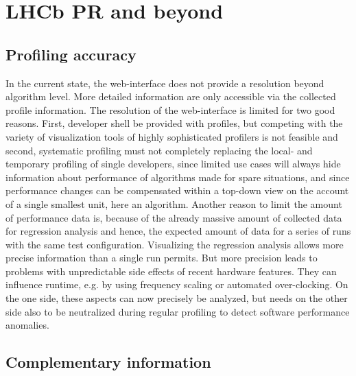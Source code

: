 \documentclass[a4paper]{jpconf}
\begin{document}
\section{LHCb PR and beyond}
\label{sec:lhcbpr_and_beyond}

\subsection{Profiling accuracy}
\label{sec:profiling accuracy}

In the current state, the web-interface does not provide a resolution beyond algorithm level. More detailed information are only accessible via the collected profile information. The resolution of the web-interface is limited for two good reasons. First, developer shell be provided with profiles, but competing with the variety of visualization tools of highly sophisticated profilers is not feasible and second, systematic profiling must not completely replacing the local- and temporary profiling of single developers, since limited use cases will always hide information about performance of algorithms made for spare situations, and since performance changes can be compensated within a top-down view on the account of a single smallest unit, here an algorithm.
\newline
Another reason to limit the amount of performance data is, because of the already massive amount of collected data for regression analysis and hence, the expected amount of data for a series of runs with the same test configuration. Visualizing the regression analysis allows more precise information than a single run permits. But more precision leads to problems with unpredictable side effects of recent hardware features. They can influence runtime, e.g. by using frequency scaling or automated over-clocking. On the one side, these aspects can now precisely be analyzed, but needs on the other side also to be neutralized during regular profiling to detect software performance anomalies.

\subsection{Complementary information}
\label{sec:complementary_information}
\end{document}
